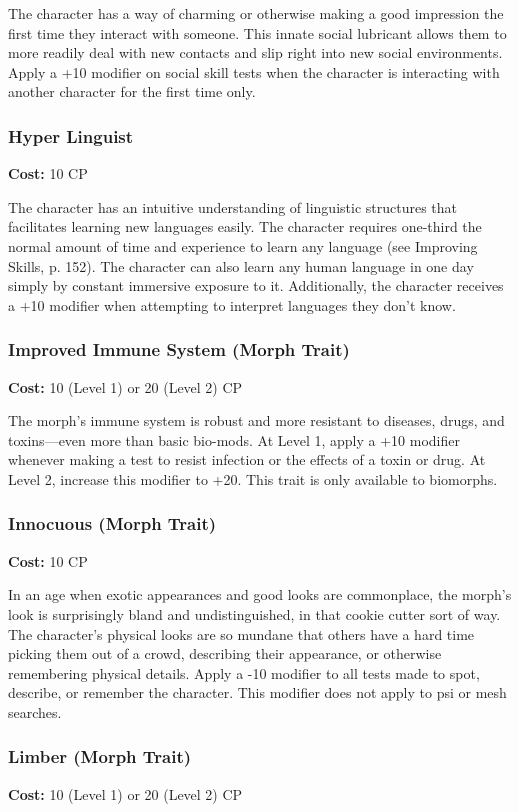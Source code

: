 The character has a way of charming or otherwise making a good impression the
first time they interact with someone. This innate social lubricant allows them
to more readily deal with new contacts and slip right into new social
environments. Apply a +10 modifier on social skill tests when the character is
interacting with another character for the first time only.

\subsubsection{Hyper Linguist}
\textbf{Cost:} 10 CP

The character has an intuitive understanding of linguistic structures that
facilitates learning new languages easily. The character requires one-third the
normal amount of time and experience to learn any language (see Improving
Skills, p. 152). The character can also learn any human language in one day
simply by constant immersive exposure to it. Additionally, the character
receives a +10 modifier when attempting to interpret languages they don’t know.

\subsubsection{Improved Immune System (Morph Trait)}
\textbf{Cost:} 10 (Level 1) or 20 (Level 2) CP

The morph’s immune system is robust and more resistant to diseases, drugs, and
toxins—even more than basic bio-mods. At Level 1, apply a +10 modifier whenever
making a test to resist infection or the effects of a toxin or drug. At Level
2, increase this modifier to +20. This trait is only available to biomorphs.

\subsubsection{Innocuous (Morph Trait)}
\textbf{Cost:} 10 CP

In an age when exotic appearances and good looks are commonplace, the morph’s
look is surprisingly bland and undistinguished, in that cookie cutter sort of
way. The character’s physical looks are so mundane that others have a hard time
picking them out of a crowd, describing their appearance, or otherwise
remembering physical details. Apply a -10 modifier to all tests made to spot,
describe, or remember the character. This modifier does not apply to psi or
mesh searches.

\subsubsection{Limber (Morph Trait)}
\textbf{Cost:} 10 (Level 1) or 20 (Level 2) CP

